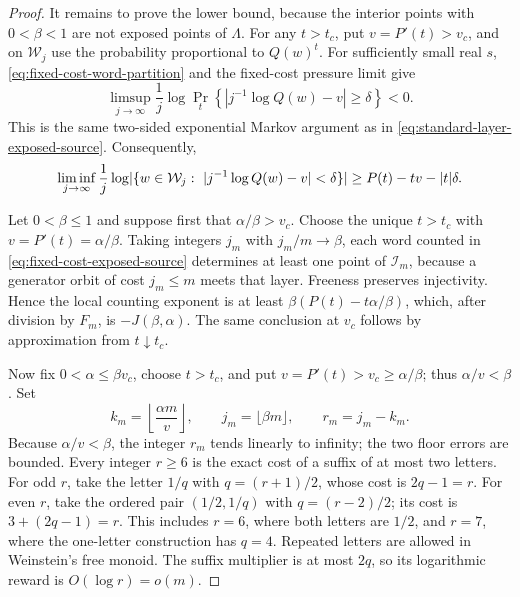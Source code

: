 \begin{proof}
It remains to prove the lower bound, because the interior points with
\(0<\beta<1\) are not exposed points of \(\Lambda\).  For any \(t>t_c\), put
\(v=P'(t)>v_c\), and on \(\mathcal W_j\) use the probability proportional to
\(Q(w)^t\).  For sufficiently small real \(s\),
\eqref{eq:fixed-cost-word-partition} and the fixed-cost pressure limit give
\[
 \limsup_{j\to\infty}\frac1j\log
 \Pr_t\left\{\left|j^{-1}\log Q(w)-v\right|\ge\delta\right\}<0.
\]
This is the same two-sided exponential Markov argument as in
\eqref{eq:standard-layer-exposed-source}.  Consequently,
\begin{equation}
 \liminf_{j\to\infty}\frac1j\log
 \lvert \{w\in\mathcal W_j:\ |j^{-1}\log Q(w)-v|<\delta\} \rvert
 \ge P(t)-tv-|t|\delta.
 \label{eq:fixed-cost-exposed-source}
\end{equation}

Let \(0<\beta\le1\) and suppose first that \(\alpha/\beta>v_c\).  Choose the
unique \(t>t_c\) with \(v=P'(t)=\alpha/\beta\).  Taking integers \(j_m\) with
\(j_m/m\to\beta\),
each word counted in \eqref{eq:fixed-cost-exposed-source} determines at least
one point of \(\mathcal I_m\), because a generator orbit of cost \(j_m\le m\)
meets that layer.  Freeness preserves injectivity.  Hence the local counting
exponent is at least
\(\beta(P(t)-t\alpha/\beta)\), which, after division by \(F_m\), is
\(-J(\beta,\alpha)\).  The same conclusion at \(v_c\) follows by approximation
from \(t\downarrow t_c\).

Now fix \(0<\alpha\le\beta v_c\), choose \(t>t_c\), and put
\(v=P'(t)>v_c\ge\alpha/\beta\); thus \(\alpha/v<\beta\).  Set
\[
 k_m=\left\lfloor\frac{\alpha m}{v}\right\rfloor,
 \qquad j_m=\lfloor\beta m\rfloor,
 \qquad r_m=j_m-k_m.
\]
Because \(\alpha/v<\beta\), the integer \(r_m\) tends linearly to infinity;
the two floor errors are bounded.  Every integer \(r\ge6\) is the exact cost
of a suffix of at most two letters.  For odd \(r\), take the letter \(1/q\)
with \(q=(r+1)/2\), whose cost is \(2q-1=r\).  For even \(r\), take the
ordered pair \((1/2,1/q)\) with \(q=(r-2)/2\); its cost is
\(3+(2q-1)=r\).  This includes \(r=6\), where both letters are \(1/2\), and
\(r=7\), where the one-letter construction has \(q=4\).  Repeated letters
are allowed in Weinstein's free monoid.  The suffix multiplier is at most
\(2q\), so its logarithmic reward is \(O(\log r)=o(m)\).


\end{proof}
